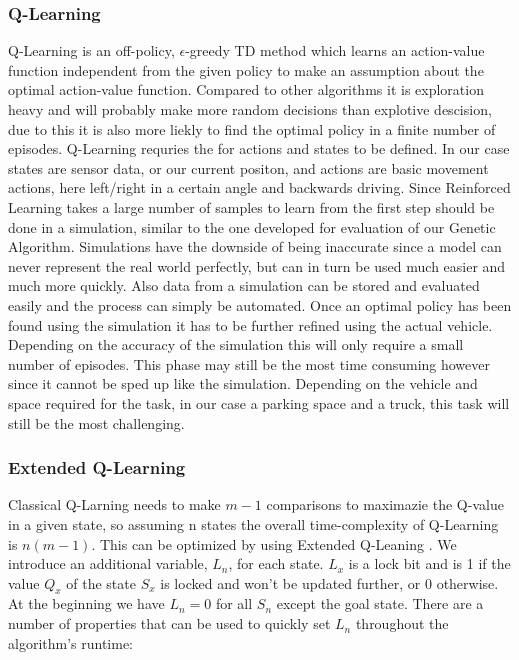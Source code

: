 \subsubsection{Q-Learning}
\label{sec:q-learning}

Q-Learning is an off-policy, $\epsilon$-greedy TD method which learns an action-value function independent from the given policy to make an assumption about the optimal action-value function. Compared to other algorithms it is exploration heavy and will probably make more random decisions than explotive descision, due to this it is also more liekly to find the optimal policy in a finite number of episodes. Q-Learning requries the for actions and states to be defined. In our case states are sensor data, or our current positon, and actions are basic movement actions, here left/right in a certain angle and backwards driving. Since Reinforced Learning takes a large number of samples to learn from the first step should be done in a simulation, similar to the one developed for evaluation of our Genetic Algorithm. Simulations have the downside of being inaccurate since a model can never represent the real world perfectly, but can in turn be used much easier and much more quickly. Also data from a simulation can be stored and evaluated easily and the process can simply be automated. Once an optimal policy has been found using the simulation it has to be further refined using the actual vehicle. Depending on the accuracy of the simulation this will only require a small number of episodes. This phase may still be the most time consuming however since it cannot be sped up like the simulation. Depending on the vehicle and space required for the task, in our case a parking space and a truck, this task will still be the most challenging.

\subsubsection{Extended Q-Learning}
\label{sec:extended-q-learning}
Classical Q-Larning needs to make $m-1$ comparisons to maximazie the Q-value in a given state, so assuming n states the overall time-complexity of Q-Learning is $n(m-1)$. This can be optimized by using Extended Q-Leaning \cite{11}. We introduce an additional variable, $L_n$, for each state. $L_x$ is a lock bit and is 1 if the value $Q_x$ of the state $S_x$ is locked and won't be updated further, or 0 otherwise. At the beginning we have $L_n=0$ for all $S_n$ except the goal state. There are a number of properties that can be used to quickly set $L_n$ throughout the algorithm's runtime: 

